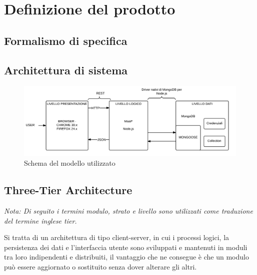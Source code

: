 \section{Definizione del prodotto}


\subsection{Formalismo di specifica}

\subsection{Architettura di sistema}

\begin{figure}[H]
\centering
\includegraphics[scale=0.2]{3-TIER.png}
\caption{Schema del modello utilizzato \label{fig:architetturadisistema}}
\end{figure}

\subsection{Three-Tier Architecture}

\emph{Nota: Di seguito i termini modulo, strato e livello sono utilizzati come traduzione del termine inglese tier.}
 
Si tratta di un architettura di tipo client-server, in cui i processi logici, la persistenza dei dati e l'interfaccia utente sono sviluppati e mantenuti in moduli tra loro indipendenti e distribuiti, il vantaggio che ne consegue è che un modulo può essere aggiornato o sostituito senza dover alterare gli altri.

